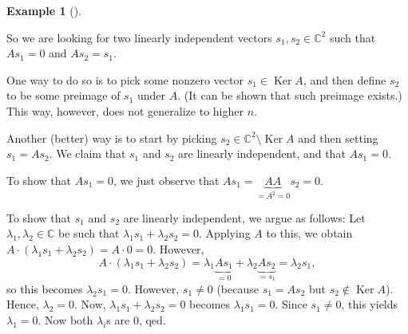 \documentclass[numbers=enddot,12pt,final,onecolumn,notitlepage]{scrartcl}%
\numberwithin{exer}{subsection}
\theoremstyle{definition}
\newtheorem{exam}[theo]{Example}
\newenvironment{example}[1][]
{\begin{exam}[#1]\begin{leftbar}}
{\end{leftbar}\end{exam}}
\begin{document}
\begin{example}
So we are looking for two linearly independent vectors $s_{1},s_{2}%
\in\mathbb{C}^{2}$ such that $As_{1}=0$ and $As_{2}=s_{1}$.

One way to do so is to pick some nonzero vector $s_{1}\in\operatorname*{Ker}%
A$, and then define $s_{2}$ to be some preimage of $s_{1}$ under $A$. (It can
be shown that such preimage exists.) This way, however, does not generalize to
higher $n$.

Another (better) way is to start by picking $s_{2}\in\mathbb{C}^{2}%
\setminus\operatorname*{Ker}A$ and then setting $s_{1}=As_{2}$. We claim that
$s_{1}$ and $s_{2}$ are linearly independent, and that $As_{1}=0$.

To show that $As_{1}=0$, we just observe that $As_{1}=\underbrace{AA}%
_{=A^{2}=0}s_{2}=0$.

To show that $s_{1}$ and $s_{2}$ are linearly independent, we argue as
follows: Let $\lambda_{1},\lambda_{2}\in\mathbb{C}$ be such that $\lambda
_{1}s_{1}+\lambda_{2}s_{2}=0$. Applying $A$ to this, we obtain $A\cdot\left(
\lambda_{1}s_{1}+\lambda_{2}s_{2}\right)  =A\cdot0=0$. However,%
\[
A\cdot\left(  \lambda_{1}s_{1}+\lambda_{2}s_{2}\right)  =\lambda
_{1}\underbrace{As_{1}}_{=0}+\lambda_{2}\underbrace{As_{2}}_{=s_{1}}%
=\lambda_{2}s_{1},
\]
so this becomes $\lambda_{2}s_{1}=0$. However, $s_{1}\neq0$ (because
$s_{1}=As_{2}$ but $s_{2}\notin\operatorname*{Ker}A$). Hence, $\lambda_{2}=0$.
Now, $\lambda_{1}s_{1}+\lambda_{2}s_{2}=0$ becomes $\lambda_{1}s_{1}=0$. Since
$s_{1}\neq0$, this yields $\lambda_{1}=0$. Now both $\lambda_{i}$s are $0$, qed.
\end{example}
\end{document}
